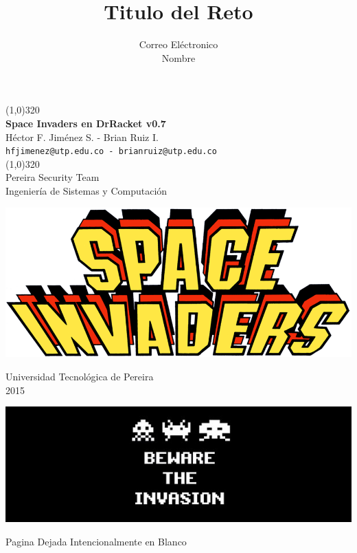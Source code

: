 \documentclass[a4paper]{article}
\title{Titulo del Reto }
\author{Correo El\'ectronico \\Nombre}
\begin{document}
\begin{titlepage} 				
\begin{center}	  				
\vfill
\line(1,0){320}\\ 				%
\huge\textbf{Space Invaders en DrRacket v0.7}\\	
\large{Héctor F. Jiménez S. - Brian Ruiz I.}\\
\large\texttt{hfjimenez@utp.edu.co - brianruiz@utp.edu.co}\\
\line(1,0){320}\\
\large{Pereira Security Team \\Ingeniería de Sistemas y Computación}
\end{center}
\vspace{4em}
\centerline{\includegraphics[width=\textwidth]{images/logo}} 			
\begin{center}
\large{Universidad Tecnológica de Pereira \\ 2015 }\\
\end{center}
\vspace{7em}																			%
\centerline{\includegraphics[width=\textwidth]{images/slice}} 									%


\end{titlepage}
\clearpage
    \thispagestyle{empty}
    \phantom{a}
    \vfill
    \begin{center}Pagina Dejada Intencionalmente en Blanco\end{center}
\end{document}
